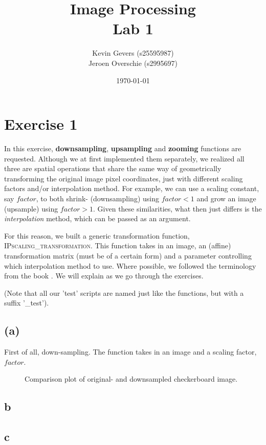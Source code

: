 \documentclass{article}
\title{Image Processing\\
    Lab 1}
\author{Kevin Gevers (s25595987) \\ Jeroen Overschie (s2995697)}
\date{\today}
\begin{document}
\maketitle

\section*{Exercise 1}
In this exercise, \textbf{downsampling}, \textbf{upsampling} and \textbf{zooming} functions are requested. Although we at first implemented them separately, we realized all three are spatial operations that share the same way of geometrically transforming the original image pixel coordinates, just with different scaling factors and/or interpolation method. For example, we can use a scaling constant, say $factor$, to both shrink- (downsampling) using $factor < 1$ and grow an image (upsample) using $factor > 1$. Given these similarities, what then just differs is the \textit{interpolation} method, which can be passed as an argument.

For this reason, we built a generic transformation function, \textsc{IPscaling\_transformation}. This function takes in an image, an (affine) transformation matrix (must be of a certain form) and a parameter controlling which interpolation method to use. Where possible, we followed the terminology from the book \citep{gonzalez2008digital}. We will explain as we go through the exercises.

(Note that all our 'test' scripts are named just like the functions, but with a suffix '\_test').
\subsection*{(a)} First of all, down-sampling. The function takes in an image and a scaling factor, $factor$. 

\begin{figure}[ht]
    \centering
    
    \caption{Comparison plot of original- and downsampled checkerboard image.}
    \label{fig:downsampling}
\end{figure}

\subsection*{b}

\subsection*{c}
\end{document}

